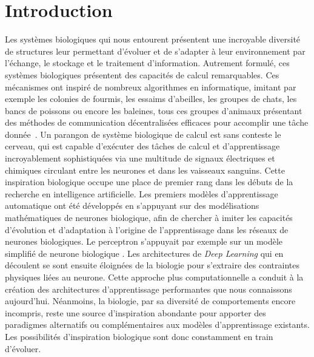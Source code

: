\chapter*{Introduction}

Les systèmes biologiques qui nous entourent présentent une incroyable diversité de structures leur permettant d'évoluer et de s'adapter à leur environnement par l'échange, le stockage et le traitement d'information.
Autrement formulé, ces systèmes biologiques présentent des capacités de calcul remarquables.
Ces mécanismes ont inspiré de nombreux algorithmes en informatique, imitant par exemple les colonies de fourmis, les essaims d'abeilles, les groupes de chats, les bancs de poissons ou encore les baleines, tous ces groupes d'animaux présentant des méthodes de communication décentralisées efficaces pour accomplir une tâche donnée~\parencite{Darwish2018BioinspiredCA}.
Un parangon de système biologique de calcul est sans conteste le cerveau, qui est capable d'exécuter des tâches de calcul et d'apprentissage incroyablement sophistiquées via une multitude de signaux électriques et chimiques circulant entre les neurones et dans les vaisseaux sanguins.
Cette inspiration biologique occupe une place de premier rang dans les débuts de la recherche en intelligence artificielle. Les premiers modèles d'apprentissage automatique ont été développés en s'appuyant sur des modélisations mathématiques de neurones biologique, afin de chercher à imiter les capacités d'évolution et d'adaptation à l'origine de l'apprentissage dans les réseaux de neurones biologiques.
Le perceptron s'appuyait par exemple sur un modèle simplifié de neurone biologique \parencite{McCulloch1990ALC}.
Les architectures de \emph{Deep Learning} qui en découlent se sont ensuite éloignées de la biologie pour s'extraire des contraintes physiques liées au neurone. Cette approche plus computationnelle a conduit à la création des architectures d'apprentissage performantes que nous connaissons aujourd'hui.
Néanmoins, la biologie, par sa diversité de comportements encore incompris, reste une source d'inspiration abondante pour apporter des paradigmes alternatifs ou complémentaires aux modèles d'apprentissage existants. Les possibilités d'inspiration biologique sont donc constamment en train d'évoluer.

